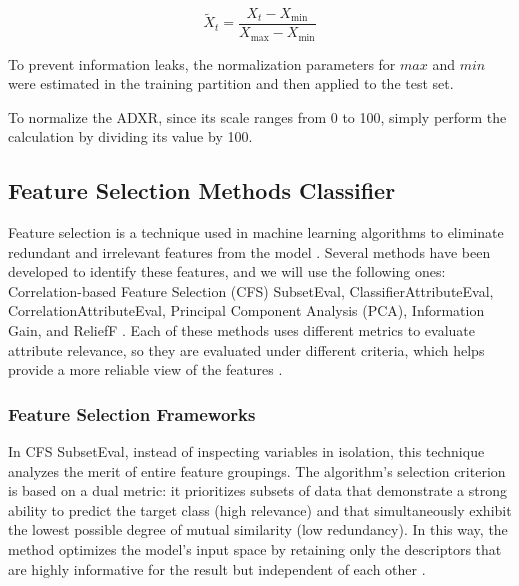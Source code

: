 \documentclass{ieeeaccess}
\begin{document}
\begin{equation}
\tilde{X}_{t} = \frac{X_{t} - X_{\min}}{X_{\max} - X_{\min}}
\label{eq:indi_norm}
\end{equation}

To prevent information leaks, the normalization parameters for $max$ and $min$ were estimated in the training partition and then applied to the test set.

To normalize the ADXR, since its scale ranges from 0 to 100, simply perform the calculation by dividing its value by 100.


\subsection{Feature Selection Methods Classifier}
\label{sec:FS_subsec}

Feature selection is a technique used in machine learning algorithms to eliminate redundant and irrelevant features from the model \cite{theng2024feature}. Several methods have been developed to identify these features, and we will use the following ones: Correlation-based Feature Selection (CFS) SubsetEval, ClassifierAttributeEval, CorrelationAttributeEval, Principal Component Analysis (PCA), Information Gain, and ReliefF \cite{bragancca2025enhancing}. Each of these methods uses different metrics to evaluate attribute relevance, so they are evaluated under different criteria, which helps provide a more reliable view of the features \cite{lamothe2025determining}.

\subsubsection{Feature Selection Frameworks}

In CFS SubsetEval, instead of inspecting variables in isolation, this technique analyzes the merit of entire feature groupings. The algorithm's selection criterion is based on a dual metric: it prioritizes subsets of data that demonstrate a strong ability to predict the target class (high relevance) and that simultaneously exhibit the lowest possible degree of mutual similarity (low redundancy). In this way, the method optimizes the model's input space by retaining only the descriptors that are highly informative for the result but independent of each other \cite{jimenez2022multivariate}.
\end{document}
